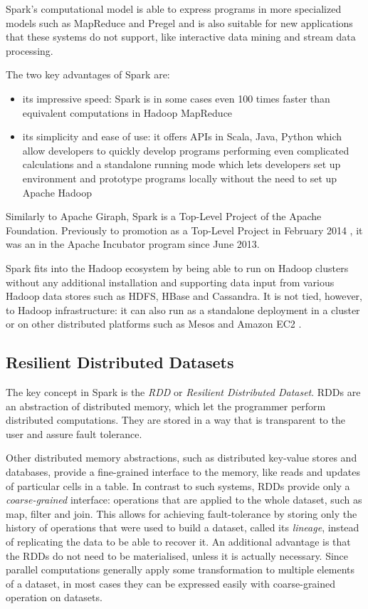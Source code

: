 Spark's computational model is able to express programs in more specialized models such as MapReduce and Pregel and is also suitable for new applications that these systems do not support, like interactive data mining and stream data processing.

The two key advantages of Spark are:
\begin{itemize}
\item its impressive speed: Spark is in some cases even 100 times faster than equivalent computations in Hadoop MapReduce
\item its simplicity and ease of use: it offers  APIs in Scala, Java, Python which allow developers to quickly develop programs performing even complicated calculations and a standalone running mode which lets developers set up environment and prototype programs locally without the need to set up Apache Hadoop 
\end{itemize}

Similarly to Apache Giraph, Spark is a Top-Level Project of the Apache Foundation. Previously to promotion as a Top-Level Project in February 2014 \cite{sparktoplevel}, it was an in the Apache Incubator program since June 2013. 

Spark fits into the Hadoop ecosystem by being able to run on Hadoop clusters without any additional installation and supporting data input from various Hadoop data stores such as HDFS, HBase and Cassandra. It is not tied, however, to Hadoop infrastructure: it can also run as a standalone deployment in a cluster or on other distributed platforms such as Mesos \cite{mesos} and Amazon EC2 \cite{ec2}.

\subsection{Resilient Distributed Datasets}
The key concept in Spark is the \emph{RDD} or \emph{Resilient Distributed Dataset}. RDDs are an abstraction of distributed memory, which let the programmer perform distributed computations. They are stored in a way that is transparent to the user and assure fault tolerance.

Other distributed memory abstractions, such as distributed key-value stores and databases, provide a fine-grained interface to the memory, like reads and updates of particular cells in a table. In contrast to such systems, RDDs provide only a \emph{coarse-grained} interface: operations that are applied to the whole dataset, such as map, filter and join. This allows for achieving fault-tolerance by storing only the history of operations that were used to build a dataset, called its \emph{lineage}, instead of replicating the data to be able to recover it. An additional advantage is that the RDDs do not need to be materialised, unless it is actually necessary. Since parallel computations generally apply some transformation to multiple elements of a dataset, in most cases they can be expressed easily with coarse-grained operation on datasets.


